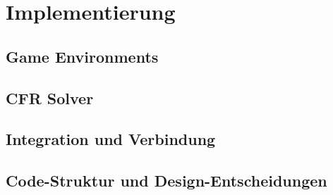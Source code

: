 \chapter{Implementierung}

\section{Game Environments}

\section{CFR Solver}

\section{Integration und Verbindung}

\section{Code-Struktur und Design-Entscheidungen}

